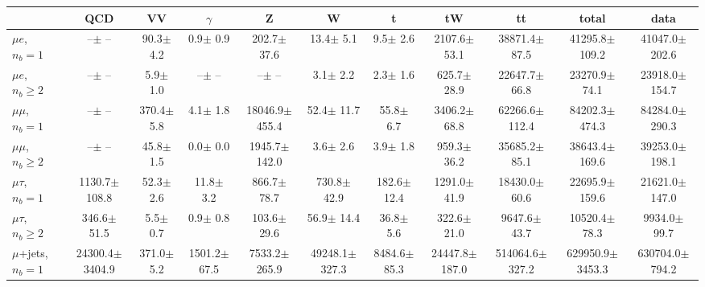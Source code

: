 \begin{sidewaystable}[p]
    \centering
    \setlength{\tabcolsep}{0.4em}
    \renewcommand{\arraystretch}{2}
    \small
    \begin{tabular}{l|cccccccc|cc}
    \hline
        & QCD & VV  & $\gamma$ & Z & W & t & tW & tt & total & data      \\
    \hline
    
    $\mu e$, $n_b=1$                   &       --$\pm$     -- &     90.3$\pm$    4.2 &      0.9$\pm$    0.9 &    202.7$\pm$   37.6 &     13.4$\pm$    5.1 &      9.5$\pm$    2.6 &   2107.6$\pm$   53.1 &  38871.4$\pm$   87.5 &  41295.8$\pm$  109.2 &  41047.0$\pm$  202.6 \\ 
    $\mu e$, $n_b\geq2$                &       --$\pm$     -- &      5.9$\pm$    1.0 &       --$\pm$     -- &       --$\pm$     -- &      3.1$\pm$    2.2 &      2.3$\pm$    1.6 &    625.7$\pm$   28.9 &  22647.7$\pm$   66.8 &  23270.9$\pm$   74.1 &  23918.0$\pm$  154.7 \\ 
    \hline
    $\mu\mu$, $n_b=1$                  &       --$\pm$     -- &    370.4$\pm$    5.8 &      4.1$\pm$    1.8 &  18046.9$\pm$  455.4 &     52.4$\pm$   11.7 &     55.8$\pm$    6.7 &   3406.2$\pm$   68.8 &  62266.6$\pm$  112.4 &  84202.3$\pm$  474.3 &  84284.0$\pm$  290.3 \\ 
    $\mu\mu$, $n_b\geq2$               &       --$\pm$     -- &     45.8$\pm$    1.5 &      0.0$\pm$    0.0 &   1945.7$\pm$  142.0 &      3.6$\pm$    2.6 &      3.9$\pm$    1.8 &    959.3$\pm$   36.2 &  35685.2$\pm$   85.1 &  38643.4$\pm$  169.6 &  39253.0$\pm$  198.1 \\ 
    \hline
    $\mu\tau$, $n_b=1$                 &   1130.7$\pm$  108.8 &     52.3$\pm$    2.6 &     11.8$\pm$    3.2 &    866.7$\pm$   78.7 &    730.8$\pm$   42.9 &    182.6$\pm$   12.4 &   1291.0$\pm$   41.9 &  18430.0$\pm$   60.6 &  22695.9$\pm$  159.6 &  21621.0$\pm$  147.0 \\ 
    $\mu\tau$, $n_b\geq2$              &    346.6$\pm$   51.5 &      5.5$\pm$    0.7 &      0.9$\pm$    0.8 &    103.6$\pm$   29.6 &     56.9$\pm$   14.4 &     36.8$\pm$    5.6 &    322.6$\pm$   21.0 &   9647.6$\pm$   43.7 &  10520.4$\pm$   78.3 &   9934.0$\pm$   99.7 \\ 
    \hline
    $\mu$+jets, $n_b=1$                &  24300.4$\pm$ 3404.9 &    371.0$\pm$    5.2 &   1501.2$\pm$   67.5 &   7533.2$\pm$  265.9 &  49248.1$\pm$  327.3 &   8484.6$\pm$   85.3 &  24447.8$\pm$  187.0 & 514064.6$\pm$  327.2 & 629950.9$\pm$ 3453.3 & 630704.0$\pm$  794.2 \\ 

\end{tabular}
\end{sidewaystable}

